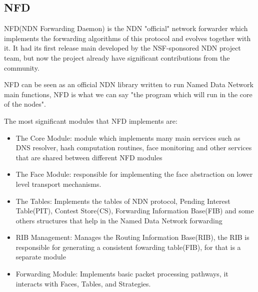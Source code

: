 \documentclass[preprint,10pt]{elsarticle}
\begin{document}
\subsection{NFD}
NFD(NDN Forwarding Daemon) is the NDN "official" network forwarder which implements the forwarding algorithms of this protocol and evolves together with it. It had its first release main developed by the NSF-sponsored NDN project team, but now the project already have significant contributions from the community.\par
NFD can be seen as an official NDN library written to run Named Data Network main functions, NFD is what we can say "the program which will run in the core of the nodes".\par
The most significant modules that NFD implements are:

	\begin{itemize}


         \item The Core Module: module which implements many main services such as DNS resolver, hash computation routines, face monitoring and other services that are shared between different NFD modules
        
        \item The Face Module: responsible for implementing the face abstraction on lower level transport mechanisms. 
        
        \item The Tables: Implements the tables of NDN protocol, Pending Interest Table(PIT), Contest Store(CS), Forwarding Information Base(FIB) and some others structures that help in the Named Data Network forwarding
        
        \item RIB Management: Manages the Routing Information Base(RIB), the RIB is responsible for generating a consistent fowarding table(FIB), for that is a separate module

        \item Forwarding Module: Implements basic packet processing pathways, it interacts with Faces, Tables, and Strategies.
	\end{itemize}
\end{document}
